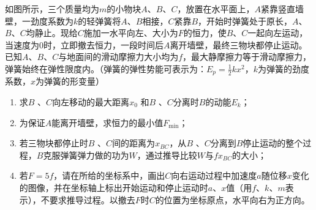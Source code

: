 如图所示，三个质量均为\(m\)的小物块\(A\)、\(B\)、\(C\)，放置在水平面上，\(A\)紧靠竖直墙壁，一劲度系数为\(k\)的轻弹簧将\(A\)、\(B\)相接，\(C\)紧靠\(B\)，开始时弹簧处于原长，\(A\)、\(B\)、\(C\)均静止。现给\(C\)施加一水平向左、大小为\(F\)的恒力，使\(B\)、\(C\)一起向左运动，当速度为0时，立即撤去恒力，一段时间后\(A\)离开墙壁，最终三物块都停止运动。已知\(A\)、\(B\)、\(C\)与地面间的滑动摩擦力大小均为\(f\)，最大静摩擦力等于滑动摩擦力，弹簧始终在弹性限度内。（弹簧的弹性势能可表示为：\(E_p = \frac{1}{2}kx^2\)，\(k\)为弹簧的劲度系数，\(x\)为弹簧的形变量）

\begin{enumerate}
    \item 求\(B\) 、\(C\)向左移动的最大距离\(x_0\) 和\(B\) 、\(C\)分离时\(B\)的动能\(E_k\)；
    \item 为保证\(A\)能离开墙壁，求恒力的最小值\(F_{\min}\)；
    \item 若三物块都停止时\(B\) 、\(C\)间的距离为\(x_{BC}\)，从\(B\) 、\(C\)分离到\(B\)停止运动的整个过程，\(B\)克服弹簧弹力做的功为\(W\)，通过推导比较\(W\)与\(fx_{BC}\)的大小；
    \item 若\(F = 5f\)，请在所给的坐标系中，画出\(C\)向右运动过程中加速度\(a\)随位移\(x\)变化的图像，并在坐标轴上标出开始运动和停止运动时\(a\)、\(x\)值（用\(f\)、\(k\)、\(m\)表示），不要求推导过程。以撤去\(F\)时\(C\)的位置为坐标原点，水平向右为正方向。
\end{enumerate}

